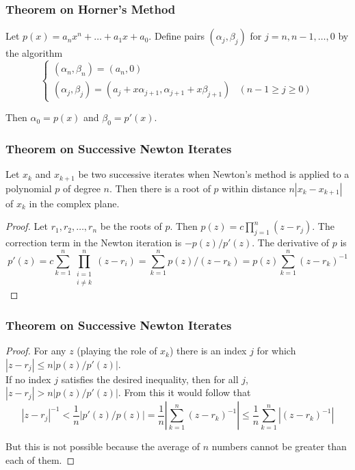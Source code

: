 \documentclass[notheorems,mathserif,table,compress]{beamer}  %
\begin{document}
\begin{frame}
\frametitle{Theorem on Horner's Method}
\begin{theorem}
Let $p(x)=a_n x^n+\ldots+a_1 x+a_0$. Define pairs $(\alpha_j,\beta_j)$ for $j=n,n-1,\ldots,0$ by the algorithm
\begin{displaymath}
\left\{\begin{array}{ll}
(\alpha_n,\beta_n)=(a_n,0)\\
(\alpha_j,\beta_j)=(a_j+x\alpha_{j+1},\alpha_{j+1}+x\beta_{j+1}) & (n-1\geq j\geq 0)
\end{array} \right.
\end{displaymath}

Then $\alpha_0=p(x)$ and $\beta_0=p'(x)$. 
\end{theorem}
\end{frame}

\begin{frame}
\frametitle{Theorem on Successive Newton Iterates}
\begin{theorem}
Let $x_k$ and $x_{k+1}$ be two successive iterates when Newton's method is applied to a polynomial $p$ of degree $n$. Then there is a root of $p$ within distance $n|x_k-x_{k+1}|$ of $x_k$ in the complex plane.
\end{theorem}
\begin{proof}
Let $r_1,r_2,\ldots,r_n$ be the roots of $p$. Then $p(z)=c\prod_{j=1}^n (z-r_j)$. The correction term in the Newton iteration is $-p(z)/p'(z)$. The derivative of $p$ is
\begin{displaymath}
p'(z)=c\sum_{k=1}^n \prod_{\substack{i=1 \\ i\neq k}}^n(z-r_i)=\sum_{k=1}^n p(z)/(z-r_k)=p(z)\sum_{k=1}^n (z-r_k)^{-1}
\end{displaymath}

\end{proof}
\end{frame}

\begin{frame}
\frametitle{Theorem on Successive Newton Iterates}
\begin{proof}
For any $z$ (playing the role of $x_k$) there is an index $j$ for which $|z-r_j|\leq n|p(z)/p'(z)|$.\\ If no index $j$ satisfies the desired inequality, then for all $j$, $|z-r_j|> n|p(z)/p'(z)|$. From this it would follow that 
\begin{displaymath}
|z-r_j|^{-1}<\frac{1}{n}|p'(z)/p(z)|=\frac{1}{n}|\sum_{k=1}^n (z-r_k)^{-1}|\leq\frac{1}{n}\sum_{k=1}^n|(z-r_k)^{-1}|
\end{displaymath}

But this is not possible because the average of $n$ numbers cannot be greater than each of them.
\end{proof}
\end{frame}
\end{document}
